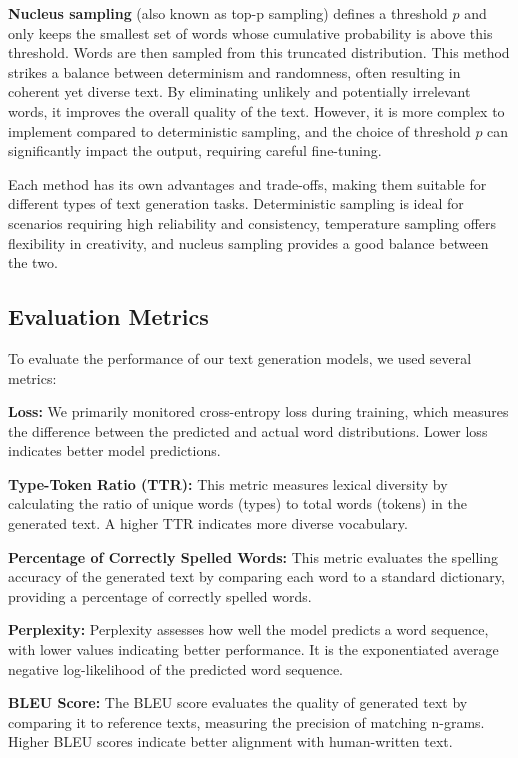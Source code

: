 \documentclass{article}
\begin{document}
\textbf{Nucleus sampling} (also known as top-p sampling) defines a threshold \(p\) and only keeps the smallest set of words whose cumulative probability is above this threshold. Words are then sampled from this truncated distribution. This method strikes a balance between determinism and randomness, often resulting in coherent yet diverse text. By eliminating unlikely and potentially irrelevant words, it improves the overall quality of the text. However, it is more complex to implement compared to deterministic sampling, and the choice of threshold \(p\) can significantly impact the output, requiring careful fine-tuning.

Each method has its own advantages and trade-offs, making them suitable for different types of text generation tasks. Deterministic sampling is ideal for scenarios requiring high reliability and consistency, temperature sampling offers flexibility in creativity, and nucleus sampling provides a good balance between the two.


\subsection{Evaluation Metrics}

To evaluate the performance of our text generation models, we used several metrics:

\textbf{Loss:} We primarily monitored cross-entropy loss during training, which measures the difference between the predicted and actual word distributions. Lower loss indicates better model predictions.

\textbf{Type-Token Ratio (TTR):} This metric measures lexical diversity by calculating the ratio of unique words (types) to total words (tokens) in the generated text. A higher TTR indicates more diverse vocabulary.

\textbf{Percentage of Correctly Spelled Words:} This metric evaluates the spelling accuracy of the generated text by comparing each word to a standard dictionary, providing a percentage of correctly spelled words.

\textbf{Perplexity:} Perplexity assesses how well the model predicts a word sequence, with lower values indicating better performance. It is the exponentiated average negative log-likelihood of the predicted word sequence.

\textbf{BLEU Score:} The BLEU score evaluates the quality of generated text by comparing it to reference texts, measuring the precision of matching n-grams. Higher BLEU scores indicate better alignment with human-written text.
\end{document}
